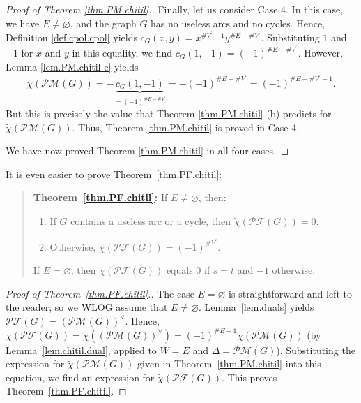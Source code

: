 \documentclass[12pt]{amsart}
\theoremstyle{definition}
\newenvironment{statement}{\begin{quote}}{\end{quote}}
\newcommand{\tup}[1]{\left( #1 \right)}
\newcommand{\chitil}{\widetilde{\chi}}
\newcommand{\Pm}[1]{\mathcal{PM}\left(#1\right)}
\newcommand{\Pf}[1]{\mathcal{PF}\left(#1\right)}
\newcommand{\NS}{V^{\prime}}
\begin{document}
\begin{proof}[Proof of Theorem \ref{thm.PM.chitil}.]
Finally, let us consider Case 4. In this case, we have $E\neq\varnothing$, and
the graph $G$ has no useless arcs and no cycles. Hence, Definition
\ref{def.cpol.cpol} yields $c_{G}\left(  x,y\right)  =x^{\#\NS%
-1}y^{\#E-\#\NS}$. Substituting $1$ and $-1$ for $x$ and $y$ in this
equality, we find $c_{G}\left(  1,-1\right)
=\left(  -1\right)  ^{\#E-\#\NS}$.
However, Lemma \ref{lem.PM.chitil-c} yields%
\[
\widetilde{\chi}\left(  \Pm{G}\right)
=-\underbrace{c_{G}\left(  1,-1\right)  }_{=\left(  -1\right)
^{\#E-\#\NS}}=-\left(  -1\right)  ^{\#E-\#\NS}=\left(
-1\right)  ^{\#E-\#\NS -1}.
\]
But this is precisely the value that Theorem \ref{thm.PM.chitil} (b)
predicts for $\widetilde{\chi}\left(  \Pm{G}\right)  $. Thus, Theorem
\ref{thm.PM.chitil} is proved in Case 4.

We have now proved Theorem \ref{thm.PM.chitil} in all four cases.
\end{proof}

It is even easier to prove Theorem~\ref{thm.PF.chitil}:

\begin{statement} \textbf{Theorem~\ref{thm.PF.chitil}:}
If $E \neq \varnothing$, then:
\begin{enumerate}
    \item[(a)] If $G$ contains a useless arc or a cycle, then $\chitil\tup{\Pf{G}} = 0$.
    \item[(b)] Otherwise, $\chitil\tup{\Pf{G}} = \tup{-1}^{\# \NS}$.
\end{enumerate}
If $E = \varnothing$, then $\chitil\tup{\Pf{G}}$ equals $0$ if $s = t$ and $-1$ otherwise.
\end{statement}

\begin{proof}[Proof of Theorem~\ref{thm.PF.chitil}.]
The case $E = \varnothing$ is straightforward and left to the reader;
so we WLOG assume that $E \neq \varnothing$.
Lemma~\ref{lem.duals} yields
$\Pf{G} = \left(  \Pm{G} \right)  ^{\vee}$. Hence,
$\widetilde{\chi}\left(  \Pf{G} \right)  = \widetilde{\chi}\left(
\left(  \Pm{G} \right)  ^{\vee}\right)  = \left(  -1 \right)  ^{\# E
- 1} \widetilde{\chi}\left(  \Pm{G} \right)  $ (by
Lemma~\ref{lem.chitil.dual}, applied to $W = E$ and $\Delta= \Pm{G}$).
Substituting the expression for $\widetilde{\chi}\left( \Pm{G}
\right)  $ given in Theorem~\ref{thm.PM.chitil} into this equation, we
find an expression for $\widetilde{\chi}\left(  \Pf{G} \right)  $.
This proves Theorem~\ref{thm.PF.chitil}.
\end{proof}
\end{document}
